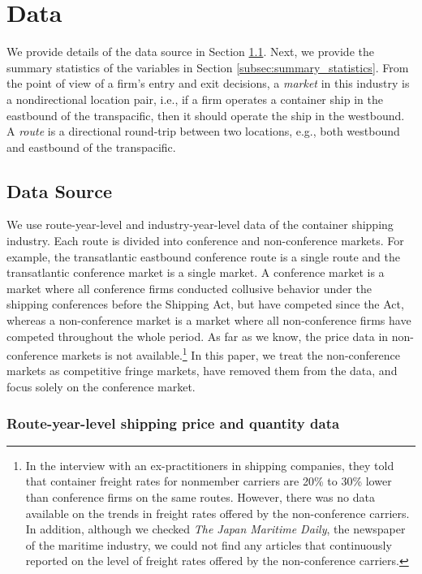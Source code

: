 \documentclass[11pt]{article}
\begin{document}
\section{Data}\label{sec:data}

We provide details of the data source in Section \ref{subsec:data}. Next, we provide the summary statistics of the variables in Section \ref{subsec:summary_statistics}. From the point of view of a firm's entry
and exit decisions, a \textit{market} in this industry is a nondirectional location pair, i.e., if a firm operates a container ship in the eastbound of the transpacific, then it should operate the ship in the westbound. A \textit{route} is a directional round-trip between two locations, e.g., both westbound and eastbound of the transpacific.

\subsection{Data Source}\label{subsec:data}
We use route-year-level and industry-year-level data of the container shipping industry. Each route is divided into conference and non-conference markets. For example, the transatlantic eastbound conference route is a single route and the transatlantic conference market is a single market. A conference market is a market where all conference firms conducted collusive behavior under the shipping conferences before the Shipping Act, but have competed since the Act, whereas a non-conference market is a market where all non-conference firms have competed throughout the whole period. As far as we know, the price data in non-conference markets is not available.\footnote{In the interview with an ex-practitioners in shipping companies, they told that container freight rates for nonmember carriers are 20\% to 30\% lower than conference firms on the same routes. However, there was no data available on the trends in freight rates offered by the non-conference carriers. In addition, although we checked \textit{The Japan Maritime Daily}, the newspaper of the maritime industry, we could not find any articles that continuously reported on the level of freight rates offered by the non-conference carriers.} In this paper, we treat the non-conference markets as competitive fringe markets, have removed them from the data, and focus solely on the conference market.

\subsubsection{Route-year-level shipping price and quantity data}
\end{document}

